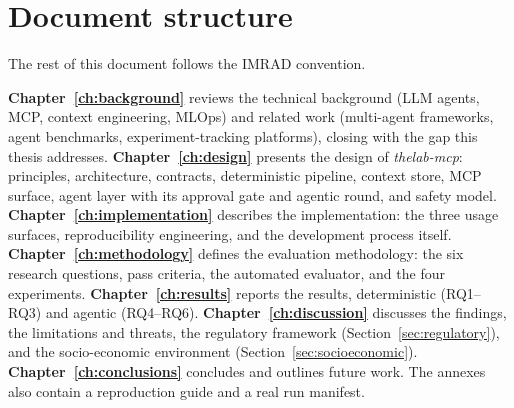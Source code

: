 \section{Document structure}
\label{sec:structure}

The rest of this document follows the IMRAD convention.

\textbf{Chapter~\ref{ch:background}} reviews the technical background (LLM agents, MCP, context engineering, MLOps) and related work (multi-agent frameworks, agent benchmarks, experiment-tracking platforms), closing with the gap this thesis addresses. \textbf{Chapter~\ref{ch:design}} presents the design of {\emph{thelab-mcp}}: principles, architecture, contracts, deterministic pipeline, context store, MCP surface, agent layer with its approval gate and agentic round, and safety model. \textbf{Chapter~\ref{ch:implementation}} describes the implementation: the three usage surfaces, reproducibility engineering, and the development process itself. \textbf{Chapter~\ref{ch:methodology}} defines the evaluation methodology: the six research questions, pass criteria, the automated evaluator, and the four experiments. \textbf{Chapter~\ref{ch:results}} reports the results, deterministic (RQ1--RQ3) and agentic (RQ4--RQ6). \textbf{Chapter~\ref{ch:discussion}} discusses the findings, the limitations and threats, the regulatory framework (Section~\ref{sec:regulatory}), and the socio-economic environment (Section~\ref{sec:socioeconomic}). \textbf{Chapter~\ref{ch:conclusions}} concludes and outlines future work. The annexes also contain a reproduction guide and a real run manifest.
